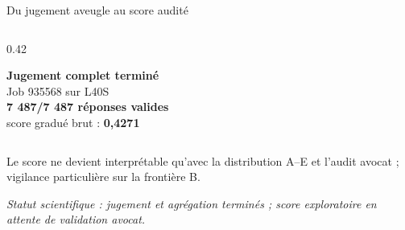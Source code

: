 \documentclass[aspectratio=169,10pt]{beamer}
\newcommand{\keybox}[1]{%
  \begin{center}\colorbox{accentsoft}{\parbox{0.92\linewidth}{\centering #1}}\end{center}}
\newcommand{\warnbox}[1]{%
  \begin{center}\colorbox{yellow!18}{\parbox{0.92\linewidth}{\centering #1}}\end{center}}
\newcommand{\status}[1]{\vfill\tiny\textit{Statut scientifique : #1}}
\begin{document}
\begin{frame}{Du jugement aveugle au score audité}
\begin{columns}[T,onlytextwidth]
\begin{column}{0.42\textwidth}
      \vspace{0.4em}
      \keybox{\textbf{Jugement complet terminé}\\[0.3em]
      Job 935568 sur L40S\\
      \textbf{7 487/7 487 réponses valides}\\
      score gradué brut : \textbf{0,4271}}
    \end{column}
  \end{columns}

  \vspace{0.55em}
  \warnbox{\small Le score ne devient interprétable qu'avec la distribution A--E et l'audit avocat ; vigilance particulière sur la frontière B.}
  \status{jugement et agrégation terminés ; score exploratoire en attente de validation avocat.}
\end{frame}
\end{document}
